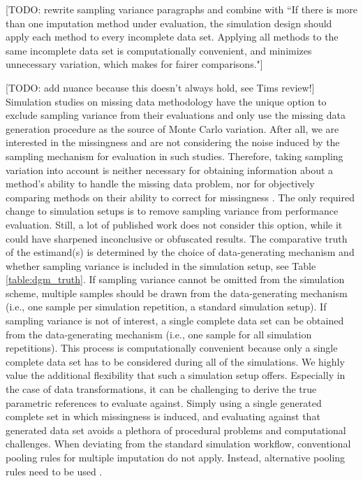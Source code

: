 \documentclass[bimj,fleqn]{w-art}
\begin{document}
[TODO: rewrite sampling variance paragraphs and combine with ``If there is more than one imputation method under evaluation, the simulation design should apply each method to every incomplete data set. Applying all methods to the same incomplete data set is computationally convenient, and minimizes unnecessary variation, which makes for fairer comparisons."]

[TODO: add nuance because this doesn't always hold, see Tims review!] Simulation studies on missing data methodology have the unique option to exclude sampling variance from their evaluations and only use the missing data generation procedure as the source of Monte Carlo variation. After all, we are interested in the missingness and are not considering the noise induced by the sampling mechanism for evaluation in such studies. Therefore, taking sampling variation into account is neither necessary for obtaining information about a method's ability to handle the missing data problem, nor for objectively comparing methods on their ability to correct for missingness \citep[see for a detailed discussion][]{vink14}. The only required change to simulation setups is to remove sampling variance from performance evaluation. Still, a lot of published work does not consider this option, while it could have sharpened inconclusive or obfuscated results. The comparative truth of the estimand(s) is determined by the choice of data-generating mechanism and whether sampling variance is included in the simulation setup, see Table \ref{table:dgm_truth}. If sampling variance cannot be omitted from the simulation scheme, multiple samples should be drawn from the data-generating mechanism (i.e., one sample per simulation repetition, a standard simulation setup). If sampling variance is not of interest, a single complete data set can be obtained from the data-generating mechanism (i.e., one sample for all simulation repetitions). This process is computationally convenient because only a single complete data set has to be considered during all of the simulations. We highly value the additional flexibility that such a simulation setup offers. Especially in the case of data transformations, it can be challenging to derive the true parametric references to evaluate against. Simply using a single generated complete set in which missingness is induced, and evaluating against that generated data set avoids a plethora of procedural problems and computational challenges.
When deviating from the standard simulation workflow, conventional pooling rules for multiple imputation \citep[cf.][p. 76-77]{rubi87} do not apply. Instead, alternative pooling rules need to be used \citep{raghunathan2003multiple,vink14}.
\end{document}
